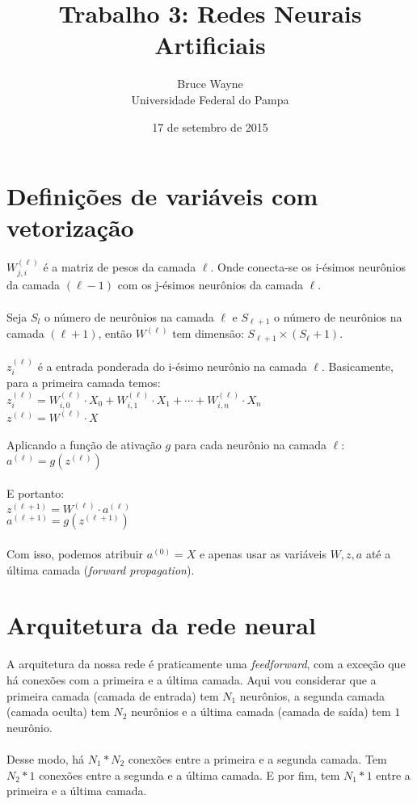 \documentclass[10pt, a4paper]{article}
\title{Trabalho 3: Redes Neurais Artificiais}
\author{Bruce Wayne \\ Universidade Federal do Pampa}
\date{17 de setembro de 2015}
\begin{document}
\maketitle

\section{Definições de variáveis com vetorização}

\textbf{$W^{(\ell)}_{j,i}$} é a matriz de pesos da camada $\ell$. Onde conecta-se os i-ésimos neurônios da camada $(\ell-1)$ com os j-ésimos neurônios da camada $\ell$. 
\\ \\
Seja $S_l$ o número de neurônios na camada $\ell$ e $S_{\ell + 1}$ o número de neurônios na camada $(\ell + 1)$, então $W^{(\ell)}$ tem dimensão: $S_{\ell + 1} \times (S_\ell + 1)$.
\\ \\
$z^{(\ell)}_i$ é a entrada ponderada do i-ésimo neurônio na camada $\ell$. Basicamente, para a primeira camada temos:
\\
$z^{(\ell)}_i = W^{(\ell)}_{i,0} \cdot X_0 + W^{(\ell)}_{i,1} \cdot X_1 + \cdots + W^{(\ell)}_{i,n} \cdot X_n$
\\
$z^{(\ell)} = W^{(\ell)} \cdot X$
\\ \\
Aplicando a função de ativação $g$ para cada neurônio na camada $\ell$:
\\
$a^{(\ell)} = g(z^{(\ell)})$
\\ \\
E portanto:
\\
$z^{(\ell + 1)} = W^{(\ell)} \cdot a^{(\ell)}$ 
\\
$a^{(\ell + 1)} = g(z^{(\ell + 1)})$
\\ \\
Com isso, podemos atribuir $a^{(0)} = X$ e apenas usar as variáveis $W, z, a$ até a última camada (\textit{forward propagation}).


\section{Arquitetura da rede neural}

A arquitetura da nossa rede é praticamente uma \textit{feedforward}, com a exceção que há conexões com a primeira e a última camada. Aqui vou considerar que a primeira camada (camada de entrada) tem $N_1$ neurônios, a segunda camada (camada oculta) tem $N_2$ neurônios e a última camada (camada de saída) tem $1$ neurônio. 
\\ \\
Desse modo, há $N_1 * N_2$ conexões entre a primeira e a segunda camada. Tem $N_2 * 1$ conexões entre a segunda e a última camada. E por fim, tem $N_1 * 1$ entre a primeira e a última camada. 
\end{document}
